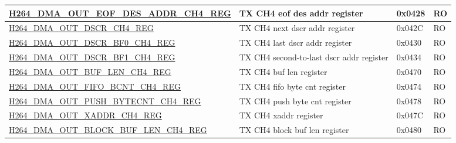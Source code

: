 \begin{longtable}{ | p{7.5cm} | p{5.7cm} | p{1.2cm} | p{1cm} | }
    \hyperref[regdesc:H264DMAOUTEOFDESADDRCH4REG]{H264\_DMA\_OUT\_EOF\_DES\_ADDR\_CH4\_REG} & TX CH4 eof des addr register & 0x0428 & RO \\ \hline
    \hyperref[regdesc:H264DMAOUTDSCRCH4REG]{H264\_DMA\_OUT\_DSCR\_CH4\_REG} & TX CH4 next dscr addr register & 0x042C & RO \\ \hline
    \hyperref[regdesc:H264DMAOUTDSCRBF0CH4REG]{H264\_DMA\_OUT\_DSCR\_BF0\_CH4\_REG} & TX CH4 last dscr addr register & 0x0430 & RO \\ \hline
    \hyperref[regdesc:H264DMAOUTDSCRBF1CH4REG]{H264\_DMA\_OUT\_DSCR\_BF1\_CH4\_REG} & TX CH4 second-to-last dscr addr register & 0x0434 & RO \\ \hline
    \hyperref[regdesc:H264DMAOUTBUFLENCH4REG]{H264\_DMA\_OUT\_BUF\_LEN\_CH4\_REG} & TX CH4 buf len register & 0x0470 & RO \\ \hline
    \hyperref[regdesc:H264DMAOUTFIFOBCNTCH4REG]{H264\_DMA\_OUT\_FIFO\_BCNT\_CH4\_REG} & TX CH4 fifo byte cnt register & 0x0474 & RO \\ \hline
    \hyperref[regdesc:H264DMAOUTPUSHBYTECNTCH4REG]{H264\_DMA\_OUT\_PUSH\_BYTECNT\_CH4\_REG} & TX CH4 push byte cnt register & 0x0478 & RO \\ \hline
    \hyperref[regdesc:H264DMAOUTXADDRCH4REG]{H264\_DMA\_OUT\_XADDR\_CH4\_REG} & TX CH4 xaddr register & 0x047C & RO \\ \hline
    \hyperref[regdesc:H264DMAOUTBLOCKBUFLENCH4REG]{H264\_DMA\_OUT\_BLOCK\_BUF\_LEN\_CH4\_REG} & TX CH4 block buf len register & 0x0480 & RO \\ \hline
    

\end{longtable}
